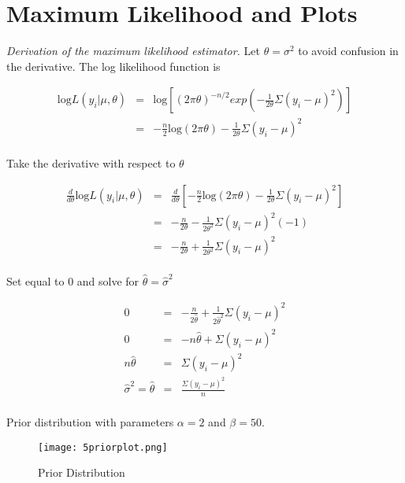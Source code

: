 \documentclass[12pt]{article}
\begin{document}
\section*{Maximum Likelihood and Plots}

\noindent \textit{Derivation of the maximum likelihood estimator.}  Let $\theta=\sigma^2$ to avoid confusion in the derivative.  The log likelihood function is

\begin{eqnarray*}
\mathrm{log}L(y_i|\mu,\theta) &=& \mathrm{log}\left[(2\pi\theta)^{-n/2}exp\left(-\frac{1}{2\theta}\Sigma(y_i-\mu)^2\right)\right] \\
&=& -\frac{n}{2}\mathrm{log}(2\pi\theta)-\frac{1}{2\theta}\Sigma(y_i-\mu)^2 \\
\end{eqnarray*}

\noindent Take the derivative with respect to $\theta$

\begin{eqnarray*}
\frac{d}{d\theta}\mathrm{log}L(y_i|\mu,\theta) &=& \frac{d}{d\theta}\left[-\frac{n}{2}\mathrm{log}(2\pi\theta)-\frac{1}{2\theta}\Sigma(y_i-\mu)^2\right] \\
&=& -\frac{n}{2\theta}-\frac{1}{2\theta^2}\Sigma(y_i-\mu)^2(-1) \\
&=& -\frac{n}{2\theta}+\frac{1}{2\theta^2}\Sigma(y_i-\mu)^2 \\
\end{eqnarray*}

\noindent Set equal to 0 and solve for $\hat{\theta}=\hat{\sigma}^2$

\begin{eqnarray*}
0 &=& -\frac{n}{2\hat{\theta}}+\frac{1}{2\hat{\theta}^2}\Sigma(y_i-\mu)^2 \\
0 &=& -n\hat{\theta}+\Sigma(y_i-\mu)^2 \\
n\hat{\theta} &=& \Sigma(y_i-\mu)^2 \\
\hat{\sigma}^2=\hat{\theta} &=& \frac{\Sigma(y_i-\mu)^2}{n} \\
\end{eqnarray*}

\noindent Prior distribution with parameters $\alpha=2$ and $\beta=50$.

\begin{figure}[H]
\begin{center}
\texttt{[image: 5priorplot.png]}
\caption{Prior Distribution}
\end{center}
\end{figure}
\end{document}

